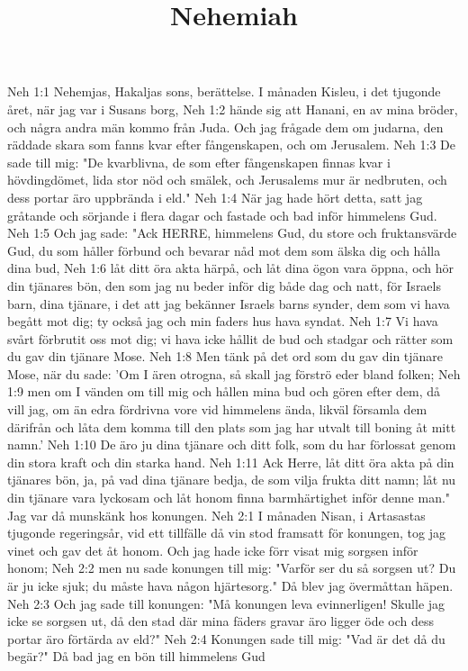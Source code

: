 

\title{Nehemiah}

Neh 1:1  Nehemjas, Hakaljas sons, berättelse. I månaden Kisleu, i det tjugonde året, när jag var i Susans borg,
Neh 1:2  hände sig att Hanani, en av mina bröder, och några andra män kommo från Juda. Och jag frågade dem om judarna, den räddade skara som fanns kvar efter fångenskapen, och om Jerusalem.
Neh 1:3  De sade till mig: "De kvarblivna, de som efter fångenskapen finnas kvar i hövdingdömet, lida stor nöd och smälek, och Jerusalems mur är nedbruten, och dess portar äro uppbrända i eld."
Neh 1:4  När jag hade hört detta, satt jag gråtande och sörjande i flera dagar och fastade och bad inför himmelens Gud.
Neh 1:5  Och jag sade: "Ack HERRE, himmelens Gud, du store och fruktansvärde Gud, du som håller förbund och bevarar nåd mot dem som älska dig och hålla dina bud,
Neh 1:6  låt ditt öra akta härpå, och låt dina ögon vara öppna, och hör din tjänares bön, den som jag nu beder inför dig både dag och natt, för Israels barn, dina tjänare, i det att jag bekänner Israels barns synder, dem som vi hava begått mot dig; ty också jag och min faders hus hava syndat.
Neh 1:7  Vi hava svårt förbrutit oss mot dig; vi hava icke hållit de bud och stadgar och rätter som du gav din tjänare Mose.
Neh 1:8  Men tänk på det ord som du gav din tjänare Mose, när du sade: 'Om I ären otrogna, så skall jag förströ eder bland folken;
Neh 1:9  men om I vänden om till mig och hållen mina bud och gören efter dem, då vill jag, om än edra fördrivna vore vid himmelens ända, likväl församla dem därifrån och låta dem komma till den plats som jag har utvalt till boning åt mitt namn.'
Neh 1:10  De äro ju dina tjänare och ditt folk, som du har förlossat genom din stora kraft och din starka hand.
Neh 1:11  Ack Herre, låt ditt öra akta på din tjänares bön, ja, på vad dina tjänare bedja, de som vilja frukta ditt namn; låt nu din tjänare vara lyckosam och låt honom finna barmhärtighet inför denne man." Jag var då munskänk hos konungen.
Neh 2:1  I månaden Nisan, i Artasastas tjugonde regeringsår, vid ett tillfälle då vin stod framsatt för konungen, tog jag vinet och gav det åt honom. Och jag hade icke förr visat mig sorgsen inför honom;
Neh 2:2  men nu sade konungen till mig: "Varför ser du så sorgsen ut? Du är ju icke sjuk; du måste hava någon hjärtesorg." Då blev jag övermåttan häpen.
Neh 2:3  Och jag sade till konungen: "Må konungen leva evinnerligen! Skulle jag icke se sorgsen ut, då den stad där mina fäders gravar äro ligger öde och dess portar äro förtärda av eld?"
Neh 2:4  Konungen sade till mig: "Vad är det då du begär?" Då bad jag en bön till himmelens Gud
